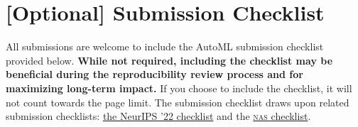 \documentclass[11pt]{article}
\begin{document}







% 

\newpage
\section{[Optional] Submission Checklist}
All submissions are welcome to include the AutoML submission checklist provided
below. \textbf{While not required, including the checklist may be beneficial
  during the reproducibility review process and for maximizing long-term
  impact.} If you choose to include the checklist, it will not count towards the
page limit. The submission checklist draws upon related submission checklists:
%
\href{https://neurips.cc/Conferences/2022/PaperInformation/PaperChecklist}
     {the NeurIPS '22 checklist}
%
and the
\href{https://www.automl.org/wp-content/uploads/NAS/NAS_checklist.pdf}
     {\textsc{nas} checklist}.
%
\end{document}
